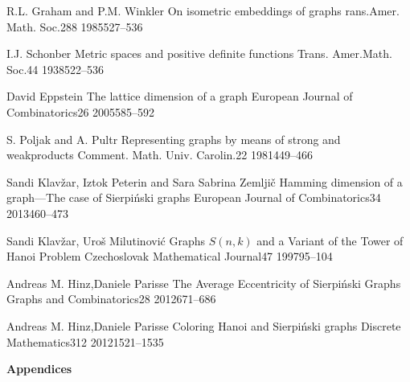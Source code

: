 \documentclass[12pt,a4paper,titlepage,openany]{report}
\begin{document}
 \begin{thebibliography}{99}
\thispagestyle{fancy}

  \articleInJournalManyAuthors
    {R.L. Graham and P.M. Winkler}
    {On isometric embeddings of graphs}
   {rans.Amer. Math. Soc.}{288}
   {1985}{527--536}

\articleInJournalOneAuthor
    {I.J. Schonber}
    {Metric spaces and positive definite functions}
   {Trans. Amer.Math. Soc.}{44}
   {1938}{522--536}

\articleInJournalOneAuthor
    {David Eppstein}
    {The lattice dimension of a graph}
   {European Journal of Combinatorics}{26}
   {2005}{585--592} 

  \articleInJournalManyAuthors
    {S. Poljak and A. Pultr}
    {Representing graphs by means of strong and weakproducts}
   {Comment. Math. Univ. Carolin.}{22}
   {1981}{449--466}  
   
  \articleInJournalManyAuthors
    {Sandi Klav\v zar, Iztok Peterin and Sara Sabrina Zemlji\v c}
    {Hamming dimension of a graph—The case of Sierpi\'nski graphs}
   {European Journal of Combinatorics}{34}
   {2013}{460--473}

  \articleInJournalManyAuthors
    {Sandi Klav\v zar, Uro\v s Milutinovi\' c}
    {Graphs $S(n, k)$ and a Variant of the Tower of Hanoi Problem}
   {Czechoslovak Mathematical Journal}{47}
   {1997}{95--104}

  \articleInJournalManyAuthors
    {Andreas M. Hinz,Daniele Parisse}
    {The Average Eccentricity of Sierpiński Graphs}
   {Graphs and Combinatorics}{28}
   {2012}{671--686}
   
  \articleInJournalManyAuthors
    {Andreas M. Hinz,Daniele Parisse}
    {Coloring Hanoi and Sierpiński graphs}
   {Discrete Mathematics}{312}
   {2012}{1521--1535}   

\end{thebibliography}
\newpage


\pagestyle{fancyplain}
\vspace*{\fill}
     \begin{center}
          \bf{\Huge{Appendices}}
     \end{center}
\vspace*{\fill}
\thispagestyle{fancy}
\end{document}
